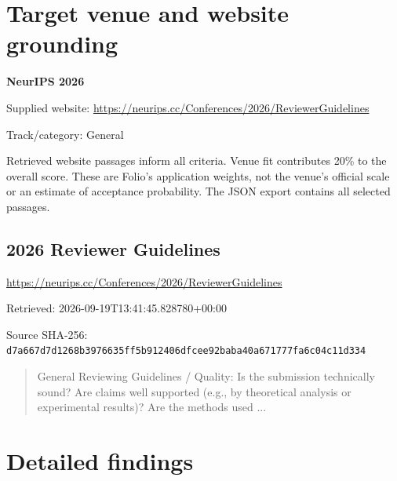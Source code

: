 \documentclass[11pt]{article}
\begin{document}
\section{Target venue and website grounding}
\textbf{NeurIPS 2026}
\par Supplied website: \url{https://neurips.cc/Conferences/2026/ReviewerGuidelines}
\par Track/category: General
\par Retrieved website passages inform all criteria. Venue fit contributes 20\% to the overall score. These are Folio's application weights, not the venue's official scale or an estimate of acceptance probability. The JSON export contains all selected passages.
\subsection*{2026 Reviewer Guidelines}
\url{https://neurips.cc/Conferences/2026/ReviewerGuidelines}
\par Retrieved: 2026-09-19T13:41:45.828780+00:00
\par Source SHA-256: \texttt{d7a667d7d1268b3976635ff5b912406d}\allowbreak\texttt{fcee92baba40a671777fa6c04c11d334}
\begin{quote}\small General Reviewing Guidelines / Quality: Is the submission technically sound? Are claims well supported (e.g., by theoretical analysis or experimental results)? Are the methods used ...\end{quote}
\section{Detailed findings}
\end{document}
